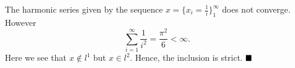 \documentclass[12pt]{article}
\newcommand{\qed}{$\hfill\blacksquare$}
\begin{document}
\begin{enumerate}
\begin{mybox}
    \setlength{\parskip}{3mm}
    The harmonic series given by the sequence
    $x=\{x_i=\frac{1}{i}\}_1^{\infty}$ does not converge.
    However $$\sum_{i=1}^{\infty}{\frac{1}{i^2}}
    =\frac{\pi^2}{6}<\infty.$$
    Here we see that $x\notin l^1$ but $x\in l^2$. Hence,
    the inclusion is strict.
    \qed
  \end{mybox}
 
  \end{enumerate}
\end{document}
